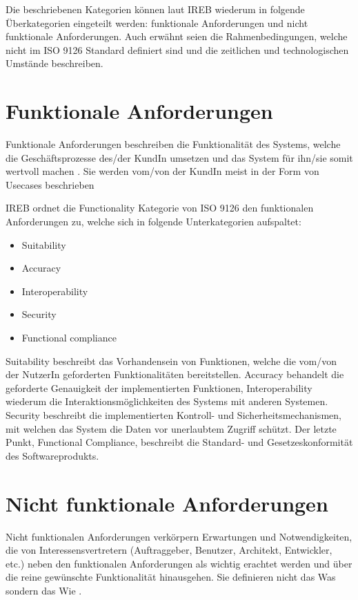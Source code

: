 Die beschriebenen Kategorien können laut IREB wiederum in folgende Überkategorien eingeteilt werden: funktionale Anforderungen und nicht funktionale Anforderungen. Auch erwähnt seien die Rahmenbedingungen, welche nicht im ISO 9126 Standard definiert sind und die zeitlichen und technologischen Umstände beschreiben.


\section{Funktionale Anforderungen}
Funktionale Anforderungen beschreiben die Funktionalität des Systems, welche die Geschäftsprozesse des/der KundIn umsetzen und das System für ihn/sie somit wertvoll machen \cite[S. 79]{reqanalysis}. Sie werden vom/von der KundIn meist in der Form von Usecases beschrieben \cite[S. 78]{reqanalysis}

IREB ordnet die Functionality Kategorie von ISO 9126 den funktionalen Anforderungen zu\cite[S. 9]{ireb}, welche sich in folgende Unterkategorien aufspaltet:

\begin{itemize}
  \item \glqq Suitability\grqq
  \item \glqq Accuracy\grqq
  \item \glqq Interoperability\grqq
  \item \glqq Security\grqq
  \item \glqq Functional compliance\grqq
\end{itemize}

Suitability beschreibt das Vorhandensein von Funktionen, welche die vom/von der NutzerIn geforderten Funktionalitäten bereitstellen. Accuracy behandelt die geforderte Genauigkeit der implementierten Funktionen, Interoperability wiederum die Interaktionsmöglichkeiten des Systems mit anderen Systemen. Security beschreibt die implementierten Kontroll- und Sicherheitsmechanismen, mit welchen das System die Daten vor unerlaubtem Zugriff schützt. Der letzte Punkt, Functional Compliance, beschreibt die Standard- und Gesetzeskonformität des Softwareprodukts. \cite[S. 8]{ISO_SQ}

\section{Nicht funktionale Anforderungen}
Nicht funktionalen Anforderungen \glqq verkörpern Erwartungen und Notwendigkeiten, die von Interessensvertretern (Auftraggeber, Benutzer, Architekt, Entwickler, etc.) neben den funktionalen Anforderungen als wichtig erachtet werden und über die reine gewünschte Funktionalität hinausgehen\grqq \cite[S. 108]{softarch}. Sie definieren nicht das Was sondern das Wie \cite[S. 80]{reqanalysis}.


